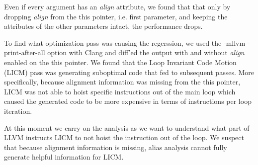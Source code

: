 Even if every argument has an \textit{align} attribute, we found that that only
by dropping \textit{align} from the this pointer, i.e. first parameter, and
keeping the attributes of the other parameters intact, the performance drops.

To find what optimization pass was causing the regerssion, we used the -mllvm
-print-after-all option with Clang and diff'ed the output with and without
\textit{align} enabled on the this pointer. We found that the Loop Invariant
Code Motion (LICM) pass was generating suboptimal code that fed to subsequent
passes. More specifically, because alignment information was missing from the
this pointer, LICM was not able to hoist specific instructions out of the main
loop which caused the generated code to be more expensive in terms of
instructions per loop iteration.

At this moment we carry on the analysis as we want to understand what part of
LLVM instructs LICM to not hoist the instruction out of the loop. We suspect
that because alignment information is missing, alias analysis cannot fully
generate helpful information for LICM.
